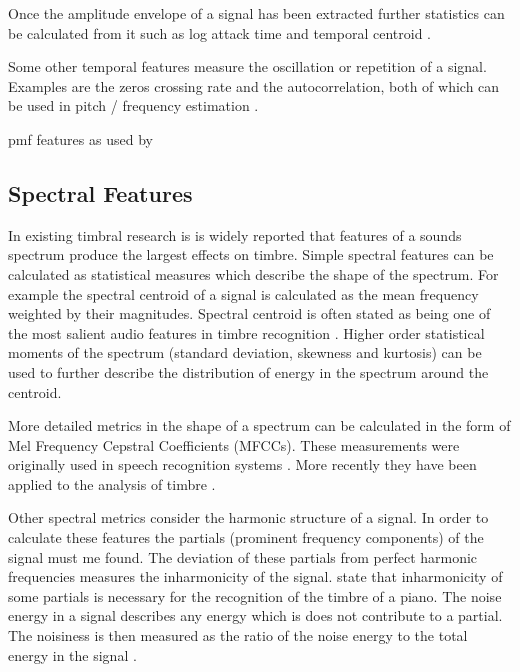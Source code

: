 		Once the amplitude envelope of a signal has been extracted further statistics can be calculated from it such
		as log attack time and temporal centroid \citep{peeters2000instrument}.

		Some other temporal features measure the oscillation or repetition of a signal. Examples are the zeros
		crossing rate and the autocorrelation, both of which can be used in pitch / frequency estimation
		\citep{mcleod2005a}.

		\note
		{
			pmf features as used by \citet{wilson2014profiling}
		}

	\subsection{Spectral Features}
	\label{sec:Timbre-LowLevelFeatures-Spectral}
		In existing timbral research is is widely reported that features of a sounds spectrum produce the largest
		effects on timbre. Simple spectral features can be calculated as statistical measures which describe the
		shape of the spectrum. For example the spectral centroid of a signal is calculated as the mean frequency
		weighted by their magnitudes. Spectral centroid is often stated as being one of the most salient audio
		features in timbre recognition \citep{freed1990auditory, lakatos2000a}. Higher order statistical moments of
		the spectrum (standard deviation, skewness and kurtosis) can be used to further describe the distribution of
		energy in the spectrum around the centroid.

		More detailed metrics in the shape of a spectrum can be calculated in the form of Mel Frequency Cepstral
		Coefficients (MFCCs). These measurements were originally used in speech recognition systems
		\citep{davis1980comparison}. More recently they have been applied to the analysis of timbre
		\citep{depoli1997sonological}. 

		Other spectral metrics consider the harmonic structure of a signal. In order to calculate these features the
		partials (prominent frequency components) of the signal must me found. The deviation of these partials from
		perfect harmonic frequencies measures the inharmonicity of the signal. \citet{fletcher1962quality} state
		that inharmonicity of some partials is necessary for the recognition of the timbre of a piano. The noise
		energy in a signal describes any energy which is does not contribute to a partial. The noisiness is then
		measured as the ratio of the noise energy to the total energy in the signal \citep{serra1998sound}.

